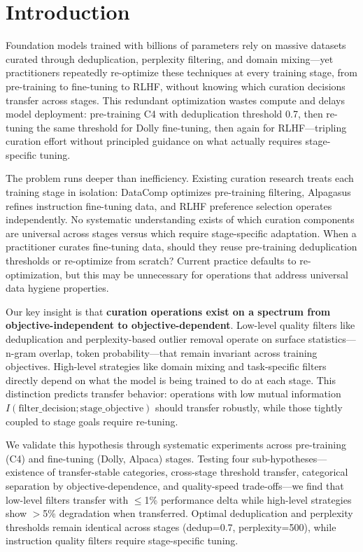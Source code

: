\section{Introduction}

Foundation models trained with billions of parameters rely on massive datasets curated through deduplication, perplexity filtering, and domain mixing—yet practitioners repeatedly re-optimize these techniques at every training stage, from pre-training to fine-tuning to RLHF, without knowing which curation decisions transfer across stages. This redundant optimization wastes compute and delays model deployment: pre-training C4 with deduplication threshold 0.7, then re-tuning the same threshold for Dolly fine-tuning, then again for RLHF—tripling curation effort without principled guidance on what actually requires stage-specific tuning.

The problem runs deeper than inefficiency. Existing curation research treats each training stage in isolation: DataComp optimizes pre-training filtering, Alpagasus refines instruction fine-tuning data, and RLHF preference selection operates independently. No systematic understanding exists of which curation components are universal across stages versus which require stage-specific adaptation. When a practitioner curates fine-tuning data, should they reuse pre-training deduplication thresholds or re-optimize from scratch? Current practice defaults to re-optimization, but this may be unnecessary for operations that address universal data hygiene properties.

Our key insight is that \textbf{curation operations exist on a spectrum from objective-independent to objective-dependent}. Low-level quality filters like deduplication and perplexity-based outlier removal operate on surface statistics—n-gram overlap, token probability—that remain invariant across training objectives. High-level strategies like domain mixing and task-specific filters directly depend on what the model is being trained to do at each stage. This distinction predicts transfer behavior: operations with low mutual information $I(\text{filter\_decision}; \text{stage\_objective})$ should transfer robustly, while those tightly coupled to stage goals require re-tuning.

We validate this hypothesis through systematic experiments across pre-training (C4) and fine-tuning (Dolly, Alpaca) stages. Testing four sub-hypotheses—existence of transfer-stable categories, cross-stage threshold transfer, categorical separation by objective-dependence, and quality-speed trade-offs—we find that low-level filters transfer with $\leq$1\% performance delta while high-level strategies show $>$5\% degradation when transferred. Optimal deduplication and perplexity thresholds remain identical across stages (dedup=0.7, perplexity=500), while instruction quality filters require stage-specific tuning.

